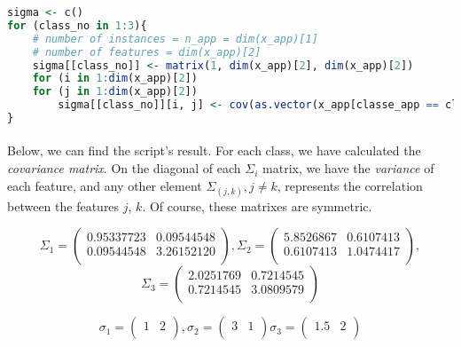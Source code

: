 \begin{lstlisting}[language=R, caption=Calculating covariance]
sigma <- c()
for (class_no in 1:3){
    # number of instances = n_app = dim(x_app)[1]
    # number of features = dim(x_app)[2]
    sigma[[class_no]] <- matrix(1, dim(x_app)[2], dim(x_app)[2])
    for (i in 1:dim(x_app)[2])
    for (j in 1:dim(x_app)[2])
        sigma[[class_no]][i, j] <- cov(as.vector(x_app[classe_app == class_no, i]), as.vector (x_app[classe_app == class_no, j]))
}
\end{lstlisting}

\paragraph{}
Below, we can find the script's result. For each class, we have calculated the \emph{covariance matrix}.
On the diagonal of each ${\Sigma}_i$ matrix, we have the \emph{variance} of each feature, and any other element ${\Sigma}_(j, k), j \neq k$, represents the correlation between the features $j$, $k$.
Of course, these matrixes are symmetric.

\[ 
    {\Sigma}_1 = 
    \left(\begin{array}{cc}
    0.95337723 & 0.09544548 \\
    0.09544548 & 3.26152120 \\
    \end{array} \right)
    , 
    {\Sigma}_2 = 
    \left( \begin{array}{cc}
    5.8526867 & 0.6107413 \\
    0.6107413 & 1.0474417 \\
    \end{array} \right)
    ,
\]
\[
    {\Sigma}_3 = 
    (\begin{array}{cc}
    2.0251769 & 0.7214545 \\
    0.7214545 & 3.0809579 \\
    \end{array})
\]

\[ 
    {\sigma}_1 = 
    \left(\begin{array}{cc}
    1 & 2 \\
    \end{array} \right)
    , 
    {\sigma}_2 = 
    \left( \begin{array}{cc}
    3 & 1 \\
    \end{array} \right)
    {\sigma}_3 = 
    \left( \begin{array}{cc}
    1.5 & 2 \\
    \end{array} \right)
\]

